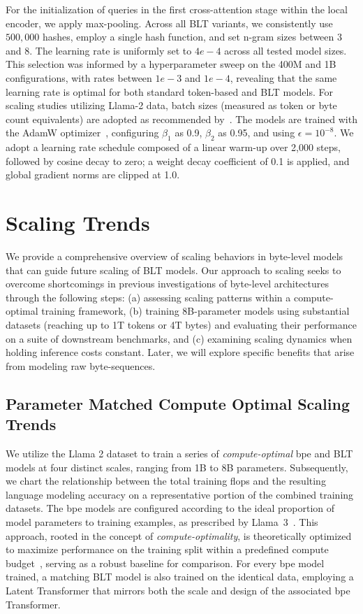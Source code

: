 For the initialization of queries in the first cross-attention stage within the local encoder, we apply max-pooling. Across all {\textsc BLT} variants, we consistently use $500,000$ hashes, employ a single hash function, and set n-gram sizes between 3 and 8. The learning rate is uniformly set to $4e-4$ across all tested model sizes. This selection was informed by a hyperparameter sweep on the 400M and 1B configurations, with rates between $1e-3$ and $1e-4$, revealing that the same learning rate is optimal for both standard token-based and {\textsc BLT} models. For scaling studies utilizing Llama-2 data, batch sizes (measured as token or byte count equivalents) are adopted as recommended by~\cite{dubey2024llama}. The models are trained with the AdamW optimizer~\citep{adamw}, configuring $\beta_1$ as 0.9, $\beta_2$ as 0.95, and using $\epsilon = 10^{-8}$. We adopt a learning rate schedule composed of a linear warm-up over 2,000 steps, followed by cosine decay to zero; a weight decay coefficient of 0.1 is applied, and global gradient norms are clipped at 1.0.

\section{Scaling Trends}
\label{section:scaling}

We provide a comprehensive overview of scaling behaviors in byte-level models that can guide future scaling of {\textsc BLT} models. Our approach to scaling seeks to overcome shortcomings in previous investigations of byte-level architectures through the following steps: (a) assessing scaling patterns within a compute-optimal training framework, (b) training 8B-parameter models using substantial datasets (reaching up to 1T tokens or 4T bytes) and evaluating their performance on a suite of downstream benchmarks, and (c) examining scaling dynamics when holding inference costs constant. Later, we will explore specific benefits that arise from modeling raw byte-sequences.

\subsection{Parameter Matched Compute Optimal Scaling Trends}
\label{section:parameter-matched-scaling}
We utilize the Llama 2 dataset to train a series of \textit{compute-optimal} bpe and {\textsc BLT} models at four distinct scales, ranging from 1B to 8B parameters. Subsequently, we chart the relationship between the total training flops and the resulting language modeling accuracy on a representative portion of the combined training datasets. The bpe models are configured according to the ideal proportion of model parameters to training examples, as prescribed by Llama~3~\citep{dubey2024llama}. This approach, rooted in the concept of \textit{compute-optimality}, is theoretically optimized to maximize performance on the training split within a predefined compute budget~\citep{hoffmann2022training}, serving as a robust baseline for comparison. For every bpe model trained, a matching {\textsc BLT} model is also trained on the identical data, employing a Latent Transformer that mirrors both the scale and design of the associated bpe Transformer.

